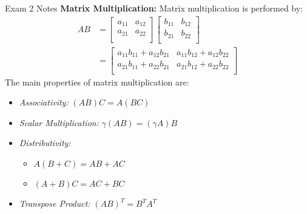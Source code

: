 \begin{cheatsheet}{Exam 2 Notes}
    \textbf{Matrix Multiplication:} Matrix multiplication is performed by:
    \begin{align*}
        AB & = 
        \begin{bmatrix}
            a_{11} & a_{12} \\
            a_{21} & a_{22} \\
        \end{bmatrix}
        \begin{bmatrix}
            b_{11} & b_{12} \\
            b_{21} & b_{22} \\
        \end{bmatrix} \\
        & = 
        \begin{bmatrix}
            a_{11}b_{11} + a_{12}b_{21} & a_{11}b_{12} + a_{12}b_{22} \\
            a_{21}b_{11} + a_{22}b_{21} & a_{21}b_{12} + a_{22}b_{22} \\
        \end{bmatrix}
    \end{align*}
    The main properties of matrix multiplication are:
    \begin{itemize}
        \item \textit{Associativity:} $(AB)C = A(BC)$
        \item \textit{Scalar Multiplication:} $\gamma(AB) = (\gamma A)B$
        \item \textit{Distributivity:}
        \begin{itemize}
            \item $A(B + C) = AB + AC$
            \item $(A + B)C = AC + BC$
        \end{itemize}
        \item \textit{Transpose Product:} $(AB)^{T} = B^{T}A^{T}$
    \end{itemize}


\end{cheatsheet}
